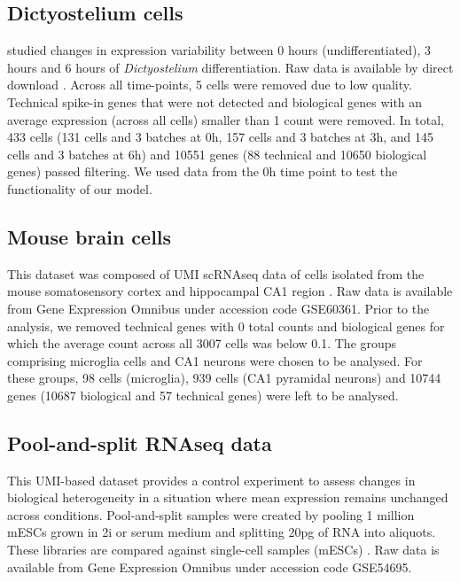 \subsection{Dictyostelium cells} \label{seq::data_dict}

\cite{Antolovic2017} studied changes in expression variability between 0 hours (undifferentiated), 3 hours and 6 hours of \emph{Dictyostelium} differentiation. Raw data is available by direct download \citep[see Data S1 in][]{Antolovic2017}. Across all time-points, 5 cells were removed due to low quality. Technical spike-in genes that were not detected and biological genes with an average expression (across all cells) smaller than 1 count were removed. In total, 433 cells (131 cells and 3 batches at 0h, 157 cells and 3 batches at 3h, and 145 cells and 3 batches at 6h) and 10551 genes (88 technical and 10650 biological genes) passed filtering. We used data from the 0h time point to test the functionality of our model.

\subsection{Mouse brain cells} \label{seq::data_micro}
This dataset was composed of UMI scRNAseq data of cells isolated from the mouse somatosensory cortex and hippocampal CA1 region \citep{Zeisel2015}. Raw data is available from Gene Expression Omnibus under accession code GSE60361. 
Prior to the analysis, we removed technical genes with 0 total counts and biological genes for which the average count across all 3007 cells was below 0.1. The groups comprising microglia cells and CA1 neurons were chosen to be analysed. For these groups, 98 cells (microglia), 939 cells (CA1 pyramidal neurons) and 10744 genes (10687 biological and 57 technical genes) were left to be analysed.

\subsection{Pool-and-split RNAseq data} \label{seq::data_PaS}

This UMI-based dataset provides a control experiment to assess changes in biological heterogeneity in a situation where mean expression remains unchanged across conditions. Pool-and-split samples were created by pooling 1 million mESCs grown in 2i or serum medium and splitting 20pg of RNA into aliquots. These libraries are compared against single-cell samples (mESCs) \citep{Grun2014}. Raw data is available from Gene Expression Omnibus under accession code GSE54695. \\

